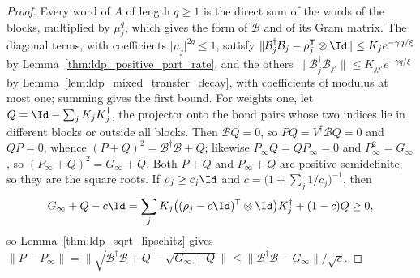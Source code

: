 \begin{proof}
    \leanok
    Every word of $A$ of length $q\geq1$ is the direct sum of the words of the blocks,
    multiplied by $\mu_j^q$, which gives the form of $\mathcal B$ and of its Gram
    matrix.
    The diagonal terms, with coefficients $\lvert\mu_j\rvert^{2q}\leq1$, satisfy
    $\lVert\mathcal B_j^\dagger\mathcal B_j-\rho_j^{\mathsf T}\otimes\Id\rVert
        \leq K_je^{-\gamma q/\xi}$ by Lemma~\ref{thm:ldp_positive_part_rate}, and the
    others $\lVert\mathcal B_j^\dagger\mathcal B_{j'}\rVert\leq K_{jj'}e^{-\gamma q/\xi}$
    by Lemma~\ref{lem:ldp_mixed_transfer_decay}, with coefficients of modulus at most one;
    summing gives the first bound. For weights one, let
    $Q=\Id-\sum_jK_jK_j^\dagger$, the projector onto the bond pairs whose two indices
    lie in different blocks or outside all blocks. Then $\mathcal BQ=0$, so
    $PQ=V^\dagger\mathcal BQ=0$ and $QP=0$, whence $(P+Q)^2=\mathcal B^\dagger\mathcal B+Q$;
    likewise $P_\infty Q=QP_\infty=0$ and $P_\infty^2=G_\infty$, so
    $(P_\infty+Q)^2=G_\infty+Q$. Both $P+Q$ and $P_\infty+Q$ are positive
    semidefinite, so they are the square roots. If $\rho_j\geq c_j\Id$ and
    $c=\bigl(1+\sum_j1/c_j\bigr)^{-1}$, then
    \begin{align*}
        G_\infty+Q-c\Id
        =\sum_jK_j\bigl((\rho_j-c\Id)^{\mathsf T}\otimes\Id\bigr)K_j^\dagger+(1-c)Q
        \geq0,
    \end{align*}
    so Lemma~\ref{thm:ldp_sqrt_lipschitz} gives
    $\lVert P-P_\infty\rVert=\lVert\sqrt{\mathcal B^\dagger\mathcal B+Q}
        -\sqrt{G_\infty+Q}\rVert\leq\lVert\mathcal B^\dagger\mathcal B-G_\infty\rVert/\sqrt c$.
\end{proof}

